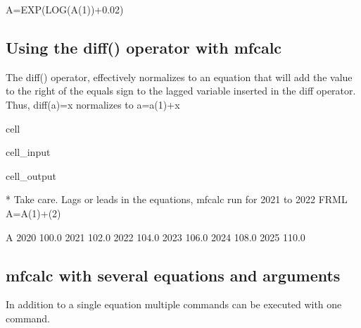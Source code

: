 \documentclass[letterpaper,10pt,english]{jupyterBook}
\begin{document}
\sphinxAtStartPar
A=EXP(LOG(A(\sphinxhyphen{}1))+0.02)


\subsection{Using the diff() operator with mfcalc}
\label{\detokenize{content/04_PythonEssentials/mfcalc:using-the-diff-operator-with-mfcalc}}
\sphinxAtStartPar
The diff() operator, effectively normalizes to an equation that will add the value to the right of the equals sign to the lagged variable inserted in the diff operator.  Thus,  diff(a)=x normalizes to a=a(\sphinxhyphen{}1)+x

\begin{sphinxuseclass}{cell}\begin{sphinxVerbatimInput}

\begin{sphinxuseclass}{cell_input}
\begin{sphinxVerbatim}[commandchars=\\\{\}]
\end{sphinxVerbatim}

\end{sphinxuseclass}\end{sphinxVerbatimInput}
\begin{sphinxVerbatimOutput}

\begin{sphinxuseclass}{cell_output}
\begin{sphinxVerbatim}[commandchars=\\\{\}]
* Take care. Lags or leads in the equations, mfcalc run for 2021 to 2022
FRML \PYGZlt{}\PYGZgt{} A=A(\PYGZhy{}1)+(2)\PYGZdl{}
\end{sphinxVerbatim}

\begin{sphinxVerbatim}[commandchars=\\\{\}]
          A
2020  100.0
2021  102.0
2022  104.0
2023  106.0
2024  108.0
2025  110.0
\end{sphinxVerbatim}

\end{sphinxuseclass}\end{sphinxVerbatimOutput}

\end{sphinxuseclass}

\subsection{mfcalc with several equations and arguments}
\label{\detokenize{content/04_PythonEssentials/mfcalc:mfcalc-with-several-equations-and-arguments}}
\sphinxAtStartPar
In addition to a single equation multiple commands can be executed with one command.
\end{document}

